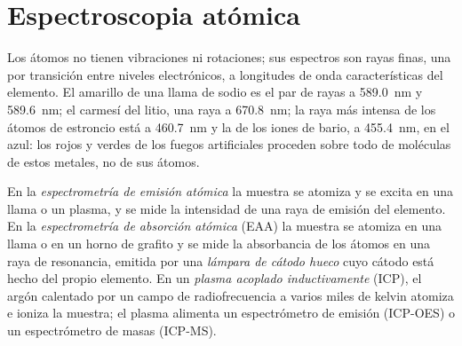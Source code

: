 \section{Espectroscopia atómica}

Los átomos no tienen vibraciones ni rotaciones; sus espectros son rayas finas, una por transición entre
niveles electrónicos, a longitudes de onda características del elemento. El amarillo de una llama de sodio es el
par de rayas a \qty{589.0}{nm} y \qty{589.6}{nm}; el carmesí del litio, una raya a \qty{670.8}{nm};
la raya más intensa de los átomos de estroncio está a \qty{460.7}{nm} y la de los iones de bario, a
\qty{455.4}{nm}, en el azul: los rojos y verdes de los fuegos artificiales proceden sobre todo de moléculas de estos
metales, no de sus átomos.

\begin{definition}\label{def:b2:mass-spec-atomic:atomic}
En la \emph{espectrometría de emisión atómica} la muestra se atomiza y se
excita en una llama o un plasma, y se mide la intensidad de una raya de emisión del elemento. En la
\emph{espectrometría de absorción atómica} (EAA) la muestra se
atomiza en una llama o en un horno de grafito y se mide la absorbancia de los átomos en una raya de
resonancia, emitida por una \emph{lámpara de cátodo hueco} cuyo cátodo está hecho del
propio elemento. En un \emph{plasma acoplado inductivamente} (ICP), el argón
calentado por un campo de radiofrecuencia a varios miles de kelvin atomiza e ioniza la muestra; el
plasma alimenta un espectrómetro de emisión (ICP-OES) o un espectrómetro de masas (ICP-MS).
\end{definition}

